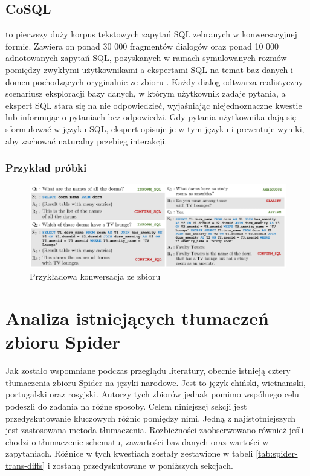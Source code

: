 \subsection{CoSQL}
 to pierwszy duży korpus tekstowych zapytań SQL zebranych w konwersacyjnej formie. Zawiera on ponad 30 000 fragmentów dialogów oraz ponad 10 000 adnotowanych zapytań SQL, pozyskanych w ramach symulowanych rozmów pomiędzy zwykłymi użytkownikami a ekspertami SQL na temat baz danych i domen pochodzących oryginalnie ze zbioru . Każdy dialog odtwarza realistyczny scenariusz eksploracji bazy danych, w którym użytkownik zadaje pytania, a ekspert SQL stara się na nie odpowiedzieć, wyjaśniając niejednoznaczne kwestie lub informując o pytaniach bez odpowiedzi. Gdy pytania użytkownika dają się sformułować w języku SQL, ekspert opisuje je w tym języku i prezentuje wyniki, aby zachować naturalny przebieg interakcji.

\subsubsection{Przykład próbki}

\begin{figure}[ht!]
  \centering
  \includegraphics[width=1.0\linewidth]{images/cosql_example.png}
  \caption{Przykładowa konwersacja ze zbioru }
  \label{fig:cosql-example}
\end{figure}

\section{Analiza istniejących tłumaczeń zbioru Spider}
Jak zostało wspomniane podczas przeglądu literatury, obecnie istnieją cztery tłumaczenia zbioru Spider na języki narodowe. Jest to język chiński, wietnamski, portugalski oraz rosyjski. Autorzy tych zbiorów jednak pomimo wspólnego celu podeszli do zadania na różne sposoby. Celem niniejszej sekcji jest przedyskutowanie kluczowych różnic pomiędzy nimi. Jedną z najistotniejszych jest zastosowana metoda tłumaczenia. Rozbieżności zaobserwowano również jeśli chodzi o tłumaczenie schematu, zawartości baz danych oraz wartości w zapytaniach. Różnice w tych kwestiach zostały zestawione w tabeli \ref{tab:spider-trans-diffs} i zostaną przedyskutowane w poniższych sekcjach.



